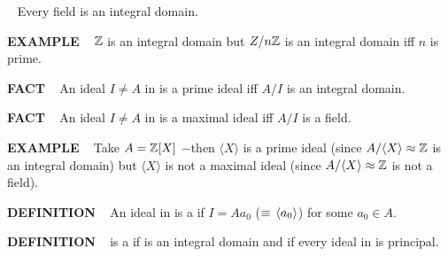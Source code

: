 \begin{x}{\small\bf {}}  \ %
Every field is an integral domain.
\end{x}

\vspace{0.1cm}

\begin{x}{\small\bf EXAMPLE} \ %
$\mathbb{Z}$ is an integral domain but $Z/n\mathbb{Z}$ is an integral domain iff $n$ is prime.
\end{x}

\vspace{0.1cm}

\begin{x}{\small\bf FACT}  \ %
An ideal $I \neq A$ in \mA is a prime ideal iff $A/I$ is an integral domain.
\end{x}

\vspace{0.1cm}

\begin{x}{\small\bf FACT}  \ %
An ideal $I \neq A$ in \mA is a maximal ideal iff $A/I$ is a field.
\end{x}

\vspace{0.1cm}

\begin{x}{\small\bf EXAMPLE} \ %
Take $A = \mathbb{Z}[X]$ $-$then $\langle X \rangle$ is a prime ideal 
(since $A/\langle X \rangle \approx \mathbb{Z}$ is an integral domain) but $\langle X \rangle$ is not a maximal ideal 
(since $A/\langle X \rangle \approx \mathbb{Z}$ is not a field).
\end{x}


\begin{x}{\small\bf DEFINITION} \ %
An ideal \mI in \mA is a 
if $I = A a_0$ ($\equiv \hspace{0.05cm} \langle a_0\rangle$) for some $a_0 \in A$.
\end{x}

\vspace{0.1cm}


\begin{x}{\small\bf DEFINITION} \ %
\mA is a 
if \mA is an integral domain and if every ideal in \mA is principal.
\end{x}

\vspace{0.1cm}

